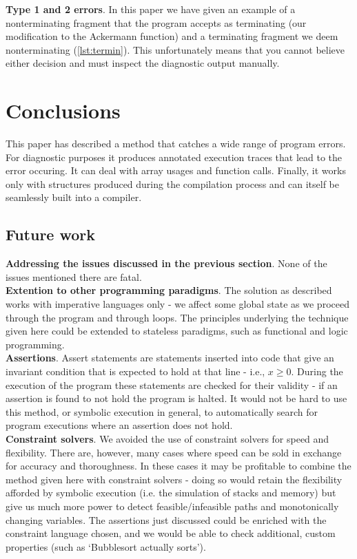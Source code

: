\documentclass[12pt,a4paper]{article}
\begin{document}
\textbf{Type 1 and 2 errors}. In this paper we have given an example of a nonterminating fragment that the program accepts as terminating (our modification to the
Ackermann function) and a terminating fragment we deem nonterminating (\cref{lst:termin}). This unfortunately means that you cannot believe either decision and must
inspect the diagnostic output manually. 

\section{Conclusions}
This paper has described a method that catches a wide range of program errors. For diagnostic purposes it produces annotated execution traces that lead
to the error occuring. It can deal with array usages and function calls. Finally, it works only with structures produced during the compilation process
and can itself be seamlessly built into a compiler. 

\subsection{Future work}
\textbf{Addressing the issues discussed in the previous section}. None of the issues mentioned there are fatal.\\

\textbf{Extention to other programming paradigms}. The solution as described works with imperative languages only - we affect some global state as we proceed through
the program and through loops. The principles underlying the technique given here could be extended to stateless paradigms, such as functional and logic programming.\\

\textbf{Assertions}. Assert statements are statements inserted into code that give an invariant condition that is expected to hold at that line - i.e., $x \geq 0$.
During the execution of the program these statements are checked for their validity - if an assertion is found to not hold the program is halted. It would not be hard
to use this method, or symbolic execution in general, to automatically search for program executions where an assertion does not hold.\\

\textbf{Constraint solvers}. We avoided the use of constraint solvers for speed and flexibility. There are, however, many cases where speed can be sold in
exchange for accuracy and thoroughness. In these cases it may be profitable to combine the method given here with constraint solvers - doing so would retain the flexibility
afforded by symbolic execution (i.e. the simulation of stacks and memory) but give us much more power to detect feasible/infeasible paths and monotonically changing variables. The assertions just discussed could be enriched with the constraint language chosen, and we would be able to check additional, custom properties (such as
`Bubblesort actually sorts').\\
\end{document}
